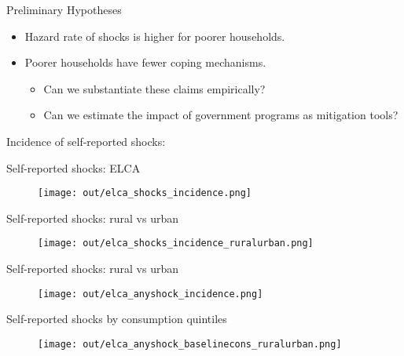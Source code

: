 \documentclass[aspectratio = 169]{beamer}
\begin{document}
  \begin{frame}{Preliminary Hypotheses}
	\begin{itemize}
	  \item Hazard rate of shocks is higher for poorer households.
	  \medskip
	  \item Poorer households have fewer coping mechanisms.
	  \bigskip
	  \begin{itemize}
	  	\item Can we substantiate these claims empirically?
	  	\medskip
	  	\item Can we estimate the impact of government programs as mitigation tools?
	  \end{itemize}
	\end{itemize}
  \end{frame}

\begin{frame}[c]{}         
	\centering
	\large Incidence of self-reported shocks: 
\end{frame}

\begin{frame}{Self-reported shocks: ELCA}

	\begin{figure}
		\texttt{[image: out/elca\_shocks\_incidence.png]}
   \end{figure}   

\end{frame}

\begin{frame}{Self-reported shocks: rural vs urban}

	\begin{figure}
		\texttt{[image: out/elca\_shocks\_incidence\_ruralurban.png]}
   \end{figure}   

\end{frame}

\begin{frame}{Self-reported shocks: rural vs urban}

	\begin{figure}
		\texttt{[image: out/elca\_anyshock\_incidence.png]}
   \end{figure}   

\end{frame}

\begin{frame}{Self-reported shocks by consumption quintiles}

	\begin{figure}
		\texttt{[image: out/elca\_anyshock\_baselinecons\_ruralurban.png]}
   \end{figure}   

\end{frame}
\end{document}

